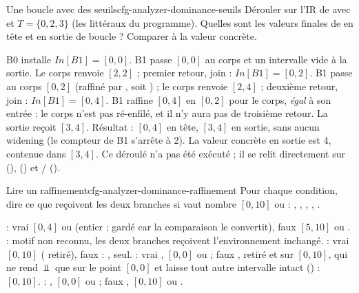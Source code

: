 \begin{exercice}{Une boucle avec des seuils}{cfg-analyzer-dominance-seuils}
  Dérouler  sur l'IR de  avec  et $T = \{0, 2, 3\}$ (les
  littéraux du programme). Quelles sont les valeurs finales de  en
  tête et en sortie de boucle ? Comparer à la valeur concrète.
\end{exercice}
\begin{solution}
  B0 installe $\mathit{In}[B1] = [0,0]$. B1 passe $[0,0]$ au corps et un
  intervalle vide à la sortie. Le corps renvoie $[2,2]$ ; premier retour,
  join : $\mathit{In}[B1] = [0,2]$. B1 passe au corps $[0,2]$ (raffiné par
  , soit ) ; le corps renvoie $[2,4]$ ; deuxième
  retour, join : $\mathit{In}[B1] = [0,4]$. B1 raffine $[0,4]$ en $[0,2]$
  pour le corps, \emph{égal} à son entrée : le corps n'est pas ré-enfilé, et
  il n'y aura pas de troisième retour. La sortie reçoit $[3,4]$. Résultat :
  $[0,4]$ en tête, $[3,4]$ en sortie, sans aucun widening (le compteur de B1
  s'arrête à 2). La valeur concrète en sortie est 4, contenue dans $[3,4]$.
  Ce déroulé n'a pas été exécuté ; il se relit directement sur 
  (), 
  () et
  /
  ().
\end{solution}

\begin{exercice}{Lire un raffinement}{cfg-analyzer-dominance-raffinement}
  Pour chaque condition, dire ce que reçoivent les deux branches si
   vaut \og nombre $[0,10]$ ou \fg{} : ,
  , , , .
\end{exercice}
\begin{solution}
   : vrai $[0,4]$ ou  (entier ;  gardé car
  la comparaison le convertit), faux $[5,10]$ ou .  :
  motif non reconnu, les deux branches reçoivent l'environnement inchangé.
   : vrai $[0,10]$ ( retiré), faux :
  ,  seul.  : vrai
  , $[0,0]$ ou  ; faux ,
   retiré et  sur $[0,10]$, qui ne rend $\Bot$
  que sur le point $[0,0]$ et laisse tout autre intervalle intact
  () : $[0,10]$.  :
  , $[0,0]$ ou  ; faux ,
  $[0,10]$ ou .
\end{solution}

